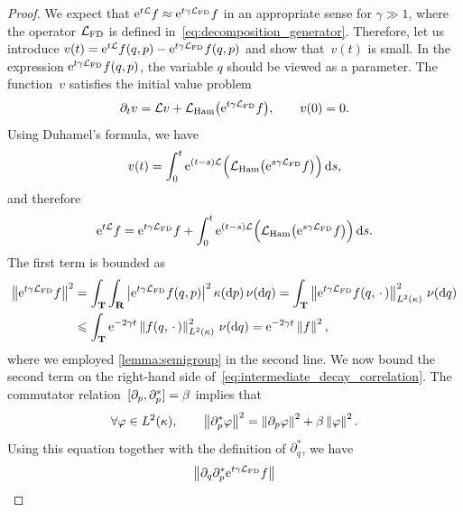 \documentclass[11pt,a4paper]{article}
\begin{document}
\begin{proof}
    We expect that $\mathrm{e}^{t \mathcal L} f \approx \mathrm{e}^{t \gamma \mathcal L_{\rm FD}} f$ in an appropriate sense for $\gamma \gg 1$,
    where the operator $\mathcal L_{\rm FD}$ is defined in~\eqref{eq:decomposition_generator}.
    Therefore, let us introduce $v(t) = \mathrm{e}^{t \mathcal L} f(q, p) - \mathrm{e}^{t \gamma \mathcal L_{\rm FD}} f(q, p)$
    and show that~$v(t)$ is small.
    In the expression $\mathrm{e}^{t \gamma \mathcal L_{\rm FD}} f(q, p)$,
    the variable $q$ should be viewed as a parameter.
    The function~$v$ satisfies the initial value problem
    \[
        \partial_t v = \mathcal L v +  \mathcal L_{\rm Ham} \bigl(\mathrm{e}^{t \gamma \mathcal L_{\rm FD}} f\bigr), \qquad v(0) = 0.
    \]
    Using Duhamel's formula, we have
    \[
        v(t) = \int_{0}^{t} \mathrm{e}^{(t-s) \mathcal L}  \Bigl( \mathcal L_{\rm Ham} \bigl(\mathrm{e}^{s \gamma \mathcal L_{\rm FD}} f\bigr) \Bigr) \, \mathrm d s,
    \]
    and therefore
    \begin{equation}
        \label{eq:intermediate_decay_correlation}
        \mathrm{e}^{t \mathcal L} f =  \mathrm{e}^{t \gamma \mathcal L_{\rm FD}} f
        + \int_{0}^{t} \mathrm{e}^{(t-s) \mathcal L}  \Bigl( \mathcal L_{\rm Ham} \bigl(\mathrm{e}^{s \gamma \mathcal L_{\rm FD}} f\bigr) \Bigr) \, \mathrm d s.
    \end{equation}
    The first term is bounded as
    \begin{align}
        \notag
        \norm{\e^{t \gamma \mathcal L_{\rm FD}} f}^2
        &= \int_{\torus} \int_{\real}  \abs{\e^{t \gamma \mathcal L_{\rm FD}} f(q, p) }^2 \kappa(\d p) \,\nu(\d q)
        = \int_{\torus} \norm{\e^{t \gamma \mathcal L_{\rm FD}} f(q, \dummy) }[L^2(\kappa)]^2 \, \nu(\d q) \\
        \label{eq:bound_first_term}
        &\leq \int_{\torus} \e^{-2 \gamma t} \norm{f(q, \dummy) }[L^2(\kappa)]^2 \, \nu(\d q)
        = \e^{-2\gamma t} \norm{f}^2,
    \end{align}
    where we employed \cref{lemma:semigroup} in the second line.
    We now bound the second term on the right-hand side of~\eqref{eq:intermediate_decay_correlation}.
    The commutator relation~$[\partial_p, \partial_p^*] = \beta$ implies that
    \[
        \forall \varphi \in L^2(\kappa), \qquad
        \norm{\partial_p^* \varphi}^2 = \norm{\partial_p \varphi}^2 + \beta \norm{\varphi}^2.
    \]
    Using this equation together with the definition of $\partial_q^*$,
    we have
    \begin{align*}
        \norm{\partial_q \partial_p^* \e^{t \gamma \mathcal L_{\rm FD}} f}

\end{align*}
\end{proof}
\end{document}
